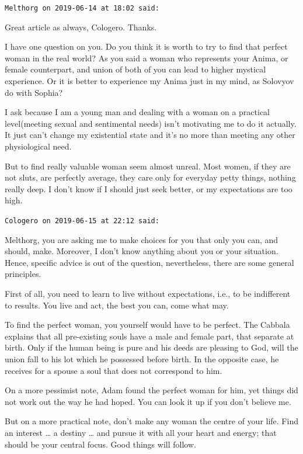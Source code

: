 \begin{footnotesize}\begin{sffamily}



\texttt{Melthorg on 2019-06-14 at 18:02 said: }

Great article as always, Cologero. Thanks.

I have one question on you. Do you think it is worth to try to find that perfect woman in the real world? As you said a woman who represents your Anima, or female counterpart, and union of both of you can lead to higher mystical experience. Or it is better to experience my Anima just in my mind, as Solovyov do with Sophia?

I ask because I am a young man and dealing with a woman on a practical level(meeting sexual and sentimental needs) isn't motivating me to do it actually. It just can't change my existential state and it's no more than meeting any other physiological need.

But to find really valuable woman seem almost unreal. Most women, if they are not sluts, are perfectly average, they care only for everyday petty things, nothing really deep. I don't know if I should just seek better, or my expectations are too high.


\hfill

\texttt{Cologero on 2019-06-15 at 22:12 said: }

Melthorg, you are asking me to make choices for you that only you can, and should, make. Moreover, I don't know anything about you or your situation. Hence, specific advice is out of the question, nevertheless, there are some general principles.

First of all, you need to learn to live without expectations, i.e., to be indifferent to results. You live and act, the best you can, come what may.

To find the perfect woman, you yourself would have to be perfect. The Cabbala explains that all pre-existing souls have a male and female part, that separate at birth. Only if the human being is pure and his deeds are pleasing to God, will the union fall to his lot which he possessed before birth. In the opposite case, he receives for a spouse a soul that does not correspond to him.

On a more pessimist note, Adam found the perfect woman for him, yet things did not work out the way he had hoped. You can look it up if you don't believe me.

But on a more practical note, don't make any woman the centre of your life. Find an interest … a destiny … and pursue it with all your heart and energy; that should be your central focus. Good things will follow.


\end{sffamily}\end{footnotesize}
